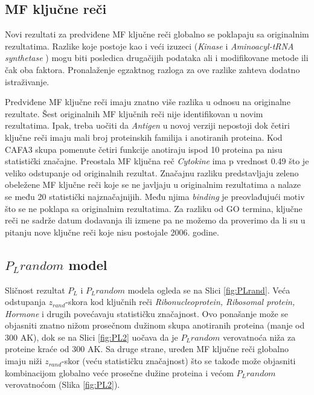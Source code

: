 \label{Diskusija} %

\subsection{MF ključne reči}

Novi rezultati za predviđene  MF ključne reči globalno se
poklapaju sa originalnim rezultatima. Razlike koje postoje kao i veći izuzeci
(\textit{Kinase} i \textit{Aminoacyl-tRNA synthetase} )  mogu biti posledica
drugačijih podataka ali i modifikovane metode ili čak oba faktora. Pronalaženje
egzaktnog razloga za ove razlike zahteva dodatno istraživanje.

Predviđene  MF ključne reči imaju znatno više razlika u
odnosu na originalne rezultate.  Šest originalnih MF ključnih reči nije
identifikovan u novim rezultatima. Ipak, treba uočiti da \textit{Antigen} u
novoj verziji nepostoji dok četiri ključne reči imaju mali broj proteinskih
familija i anotiranih proteina. Kod CAFA3 skupa pomenute četiri funkcije
anotiraju ispod 10 proteina pa nisu statistički značajne.  Preostala MF ključna
reč \textit{Cytokine} ima p vrednost 0.49 što je veliko odstupanje od
originalnih rezultat. Značajnu razliku predstavljaju zeleno obeležene MF
ključne reči koje se ne javljaju u originalnim rezultatima a nalaze se među 20
statistički najznačajnijih. Među njima \textit{binding} je preovlađujući motiv
što se ne poklapa sa originalnim rezultatima. Za razliku od GO termina, ključne
reči ne sadrže datum dodavanja ili izmene pa ne možemo da proverimo da li su u
pitanju nove ključne reči koje nisu postojale 2006. godine.




\subsection{$P_Lrandom$ model}

Sličnost rezultat $P_L$ i $P_L random$ modela ogleda se na Slici
\ref{fig:PLrand}. Veća odstupanja $z_{rand}$-skora kod ključnih reči
\textit{Ribonucleoprotein, Ribosomal protein, Hormone} i drugih povećavaju
statističku značajnost. Ovo ponašanje može se objasniti znatno nižom prosečnom
dužinom skupa anotiranih proteina (manje od 300 AK), dok se na Slici
\ref{fig:PL2} uočava da je $P_L random$ verovatnoća niža za proteine kraće od
300 AK.  Sa druge strane, uređen MF ključne reči globalno imaju niži
$z_{rand}$-skor (veću statističku značajnost) što se takođe može objasniti
kombinacijom globalno veće prosečne dužine proteina i većom $P_L random$
verovatnoćom (Slika \ref{fig:PL2}). 

